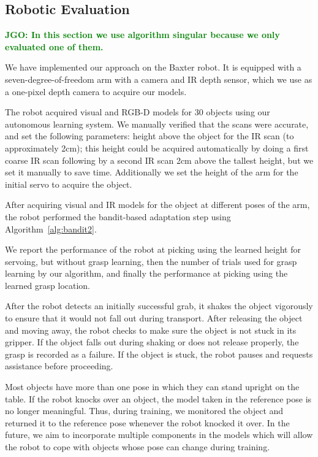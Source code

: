 \documentclass{article}
\newcommand{\jgonote}[1]{\textcolor{green}{\textbf{JGO: #1}}}
\begin{document}
\subsection{Robotic Evaluation}

\jgonote{In this section we use algorithm singular because we only evaluated one of them.}

We have implemented our approach on the Baxter
robot. It is equipped with a seven-degree-of-freedom arm with a
camera and IR depth sensor, which we use as a one-pixel depth camera
to acquire our models.

The robot acquired visual and RGB-D models for 30 objects using our
autonomous learning system.  We manually verified that the scans were
accurate, and set the following parameters: height above the object
for the IR scan (to approximately 2cm); this height could be acquired
automatically by doing a first coarse IR scan following by a second IR
scan 2cm above the tallest height, but we set it manually to save
time.  Additionally we set the height of the arm for the initial servo
to acquire the object.

After acquiring visual and IR models for the object at different poses
of the arm, the robot performed the bandit-based adaptation step using
Algorithm~\ref{alg:bandit2}.

We report the performance of the robot at picking using the learned
height for servoing, but without grasp learning, then the number of
trials used for grasp learning by our algorithm, and finally the
performance at picking using the learned grasp location.

After the robot detects an initially successful grab, it shakes the
object vigorously to ensure that it would not fall out during
transport. After releasing the object and moving away, the robot
checks to make sure the object is not stuck in its gripper. If the
object falls out during shaking or does not release properly, the
grasp is recorded as a failure. If the object is stuck, the robot
pauses and requests assistance before proceeding.

Most objects have more than one pose in which they can stand upright
on the table. If the robot knocks over an object, the model taken in
the reference pose is no longer meaningful. Thus, during training, we
monitored the object and returned it to the reference pose whenever
the robot knocked it over. In the future, we aim to incorporate
multiple components in the models which will allow the robot to cope
with objects whose pose can change during training.
\end{document}
